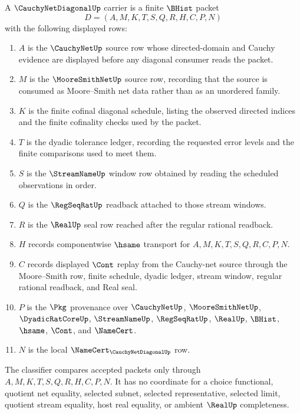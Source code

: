 \begin{definition}
\label{def:cauchy-net-diagonal-carrier}
A $\CauchyNetDiagonalUp$ carrier is a finite $\BHist$ packet
$$
D=(A,M,K,T,S,Q,R,H,C,P,N)
$$
with the following displayed rows:
\begin{enumerate}
\item $A$ is the $\CauchyNetUp$ source row whose directed-domain and Cauchy evidence are displayed before any diagonal consumer reads the packet.
\item $M$ is the $\MooreSmithNetUp$ source row, recording that the source is consumed as Moore--Smith net data rather than as an unordered family.
\item $K$ is the finite cofinal diagonal schedule, listing the observed directed indices and the finite cofinality checks used by the packet.
\item $T$ is the dyadic tolerance ledger, recording the requested error levels and the finite comparisons used to meet them.
\item $S$ is the $\StreamNameUp$ window row obtained by reading the scheduled observations in order.
\item $Q$ is the $\RegSeqRatUp$ readback attached to those stream windows.
\item $R$ is the $\RealUp$ seal row reached after the regular rational readback.
\item $H$ records componentwise $\hsame$ transport for $A,M,K,T,S,Q,R,C,P,N$.
\item $C$ records displayed $\Cont$ replay from the Cauchy-net source through the Moore--Smith row, finite schedule, dyadic ledger, stream window, regular rational readback, and Real seal.
\item $P$ is the $\Pkg$ provenance over $\CauchyNetUp$, $\MooreSmithNetUp$, $\DyadicRatCoreUp$, $\StreamNameUp$, $\RegSeqRatUp$, $\RealUp$, $\BHist$, $\hsame$, $\Cont$, and $\NameCert$.
\item $N$ is the local $\NameCert_{\CauchyNetDiagonalUp}$ row.
\end{enumerate}
The classifier compares accepted packets only through $A,M,K,T,S,Q,R,H,C,P,N$. It has no coordinate for a choice functional, quotient net equality, selected subnet, selected representative, selected limit, quotient stream equality, host real equality, or ambient $\RealUp$ completeness.
\end{definition}

